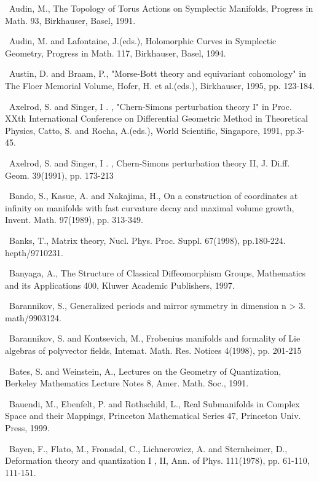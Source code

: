 {\noindent [24]\ Audin, M., The Topology of Torus Actions on Symplectic Manifolds, Progress in Math. 93, Birkhauser, Basel, 1991.\par\smallskip
\noindent [25]\ Audin, M. and Lafontaine, J.(eds.), Holomorphic Curves in Symplectic Geometry, Progress in Math. 117, Birkhauser, Basel, 1994.\par\smallskip
\noindent [26]\ Austin, D. and Braam, P., "Morse-Bott theory and equivariant cohomology" in The Floer Memorial Volume, Hofer, H. et al.(eds.), Birkhauser, 1995, pp. 123-184.\par\smallskip
\noindent [27]\ Axelrod, S. and Singer, I . , "Chern-Simons perturbation theory I" in Proc. XXth International Conference on Differential Geometric Method in Theoretical Physics, Catto, S. and Rocha, A.(eds.), World Scientific, Singapore, 1991, pp.3-45.\par\smallskip
\noindent [28]\ Axelrod, S. and Singer, I . , Chern-Simons perturbation theory II, J. Di.ff. Geom. 39(1991), pp. 173-213\par\smallskip
\noindent [29]\ Bando, S., Kasue, A. and Nakajima, H., On a construction of coordinates at infinity on manifolds with fast curvature decay and maximal volume growth, Invent. Math. 97(1989), pp. 313-349.\par\smallskip
\noindent [30]\ Banks, T., Matrix theory, Nucl. Phys. Proc. Suppl. 67(1998), pp.180-224. hepth/9710231.\par\smallskip
\noindent [31]\ Banyaga, A., The Structure of Classical Diffeomorphism Groups, Mathematics and its Applications 400, Kluwer Academic Publishers, 1997.\par\smallskip
\noindent [32]\ Barannikov, S., Generalized periods and mirror symmetry in dimension n > 3. math/9903124.\par\smallskip
\noindent [33]\ Barannikov, S. and Kontsevich, M., Frobenius manifolds and formality of Lie algebras of polyvector fields, Intemat. Math. Res. Notices 4(1998), pp. 201-215\par\smallskip
\noindent [34]\ Bates, S. and Weinstein, A., Lectures on the Geometry of Quantization, Berkeley Mathematics Lecture Notes 8, Amer. Math. Soc., 1991.\par\smallskip
\noindent [35]\ Bauendi, M., Ebenfelt, P. and Rothschild, L., Real Submanifolds in Complex Space and their Mappings, Princeton Mathematical Series 47, Princeton Univ. Press, 1999.\par\smallskip
\noindent [36]\ Bayen, F., Flato, M., Fronsdal, C., Lichnerowicz, A. and Sternheimer, D., Deformation theory and quantization I , II, Ann. of Phys. 111(1978), pp. 61-110, 111-151.\par\smallskip
}
